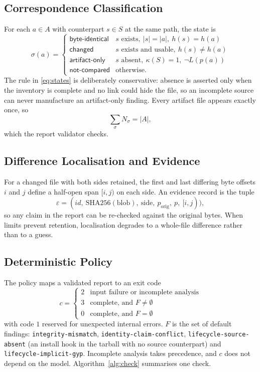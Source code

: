 \documentclass[conference]{IEEEtran}
\newcommand{\code}[1]{\texttt{#1}}
\begin{document}
\subsection{Correspondence Classification}
For each $a\in A$ with counterpart $s\in S$ at the same path, the state is
\begin{equation}
\sigma(a)=\begin{cases}
\textsf{byte-identical} & s \text{ exists},\ |s|=|a|,\ h(s)=h(a)\\
\textsf{changed} & s \text{ exists and usable},\ h(s)\neq h(a)\\
\textsf{artifact-only} & s \text{ absent},\ \kappa(S)=1,\ \neg L(p(a))\\
\textsf{not-compared} & \text{otherwise.}
\end{cases}
\label{eq:states}
\end{equation}
The rule in \eqref{eq:states} is deliberately conservative: absence is asserted
only when the inventory is complete and no link could hide the file, so an
incomplete source can never manufacture an \textsf{artifact-only} finding.
Every artifact file appears exactly once, so
\begin{equation}
\textstyle\sum_{\sigma} N_\sigma = |A|,
\end{equation}
which the report validator checks.

\subsection{Difference Localisation and Evidence}
For a \textsf{changed} file with both sides retained, the first and last
differing byte offsets $i$ and $j$ define a half-open span $[i,j)$ on each side.
An evidence record is the tuple
\begin{equation}
\varepsilon = (\mathit{id},\ \mathrm{SHA256}(\text{blob}),\ \text{side},\ p_{\text{orig}},\ p,\ [i,j)),
\end{equation}
so any claim in the report can be re-checked against the original bytes. When
limits prevent retention, localisation degrades to a whole-file difference
rather than to a guess.

\subsection{Deterministic Policy}
The policy maps a validated report to an exit code
\begin{equation}
c=\begin{cases}
2 & \text{input failure or incomplete analysis}\\
3 & \text{complete, and } F\neq\emptyset\\
0 & \text{complete, and } F=\emptyset
\end{cases}
\end{equation}
with code $1$ reserved for unexpected internal errors. $F$ is the set of
default findings: \code{integrity-mismatch}, \code{identity-claim-conflict},
\code{lifecycle-source-absent} (an install hook in the tarball with no source
counterpart) and \code{lifecycle-implicit-gyp}. Incomplete analysis takes
precedence, and $c$ does not depend on the model. Algorithm~\ref{alg:check}
summarises one check.
\end{document}
